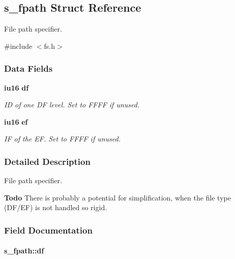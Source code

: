 \subsection{s\_\-fpath Struct Reference}
\label{structs__fpath}


File path specifier.  




{\ttfamily \#include $<$fs.h$>$}

\subsubsection*{Data Fields}
\begin{DoxyCompactItemize}
\item 
{\bf iu16} {\bf df}
\begin{DoxyCompactList}\small\item\em ID of one DF level. Set to FFFF if unused. \item\end{DoxyCompactList}\item 
{\bf iu16} {\bf ef}
\begin{DoxyCompactList}\small\item\em IF of the EF. Set to FFFF if unused. \item\end{DoxyCompactList}\end{DoxyCompactItemize}


\subsubsection{Detailed Description}
File path specifier. \begin{Desc}
\item[{\bf Todo}]There is probably a potential for simplification, when the file type (DF/EF) is not handled so rigid. \end{Desc}


\subsubsection{Field Documentation}
\paragraph[{df}]{ {\bf s\_\-fpath::df}}\hfill\label{structs__fpath_aa16acae1b4ba3966c13fe44b278ced64}



